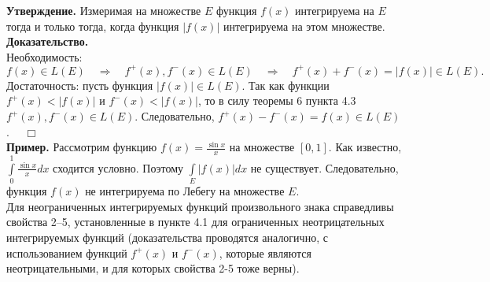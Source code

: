 \documentclass[12pt,a4paper, titlepage]{article}
\begin{document}

\textbf{Утверждение.} Измеримая на множестве $E$ функция $f(x)$ интегрируема на $E$ тогда и только тогда, когда функция $|f(x)|$ интегрируема на этом множестве.\\
\textbf{Доказательство.}\\
Необходимость:
$$
f(x) \in L(E) \quad \Rightarrow \quad f^+(x), f^-(x) \in L(E) \quad \Rightarrow \quad f^+(x) + f^-(x) = |f(x)| \in L(E).
$$
Достаточность: пусть функция $|f(x)| \in L(E)$. Так как функции $f^+(x) < |f(x)|$ и $f^-(x) < |f(x)|$, то в силу теоремы 6 пункта 4.3 $f^+(x), f^-(x) \in L(E)$. Следовательно, $f^+(x) - f^-(x) = f(x) \in L(E)$. $\quad \Box$\\

\textbf{Пример.} Рассмотрим функцию $f(x) = \frac {\sin x} x$ на множестве $[0, 1]$. Как известно, $\int\limits_0^1 \frac {\sin x} x dx$ сходится условно. Поэтому $\int\limits_E |f(x)| dx$ не существует. Следовательно, функция $f(x)$ не интегрируема по Лебегу на множестве $E$.\\

Для неограниченных интегрируемых функций произвольного знака справедливы свойства 2--5, установленные в пункте 4.1 для ограниченных неотрицательных интегрируемых функций (доказательства проводятся аналогично, с использованием функций $f^+(x)$ и $f^-(x)$, которые являются неотрицательными, и для которых свойства 2-5 тоже верны).\\
\end{document}
